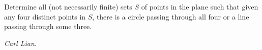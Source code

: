 Determine all (not necessarily finite) sets $S$ of points in the plane such that given any four distinct points in $S$, there is a circle passing through all four or a line passing through some three.

\textit{Carl Lian.}